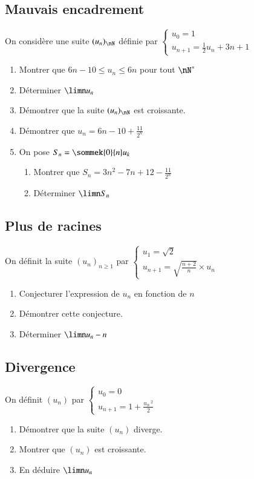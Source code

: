 \documentclass[oneside,12pt]{article}          %
\begin{document}
\subsection{Mauvais encadrement}
On considère une suite $(u_n)_{\nN}$ définie par $\begin{cases}u_0=1\\u_{n+1}=\frac{1}{2}u_n+3n+1\end{cases}$
\begin{enumerate}
    \item Montrer que $6n-10\leq u_n\leq6n$ pour tout $\nN^*$
    \item Déterminer $\limn u_n$
    \item Démontrer que la suite $(u_n)_{\nN}$ est croissante.
    \item Démontrer que $u_n=6n-10+\frac{11}{2^n}$
    \item On pose $S_n=\sommek{0}{n}u_k$
    \begin{enumerate}
    	\item Montrer que $S_n=3n^2-7n+12-\frac{11}{2^n}$
    	\item Déterminer $\limn S_n$
    \end{enumerate}
\end{enumerate}



\subsection{Plus de racines}
On définit la suite $(u_n)_{n\geq1}$ par $\begin{cases}u_1=\sqrt{2}\\u_{n+1}=\sqrt{\frac{n+2}{n}}\times u_n\end{cases}$
\begin{enumerate}
    \item Conjecturer l'expression de $u_n$ en fonction de $n$
    \item Démontrer cette conjecture.
    \item Déterminer $\limn u_n -n$
\end{enumerate}



\subsection{Divergence}
On définit $(u_n)$ par $\begin{cases}u_0=0\\u_{n+1}=1+\frac{u_n\,^2}{2}\end{cases}$
\begin{enumerate}
	\item Démontrer que la suite $(u_n)$ diverge.
	\item Montrer que $(u_n)$ est croissante.
	\item En déduire $\limn u_n$
\end{enumerate}
\end{document}
